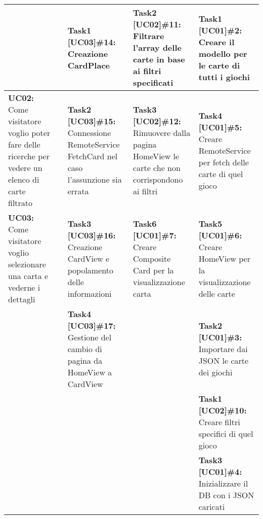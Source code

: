 \documentclass{article}
\begin{document}
\begin{itemize}
\begin{tabular}{ | p{2.4cm} | p{1.4cm} | p{2.7cm} | p{3.4cm} | p{3cm} | }
            & & \textbf{Task1 [UC03]\#14:} Creazione CardPlace
            & \textbf{Task2 [UC02]\#11:} Filtrare l'array delle carte in base ai filtri specificati
            & \textbf{Task1 [UC01]\#2:} Creare il modello per le carte di tutti i giochi \\
            \hline
            \textbf{UC02:} Come visitatore voglio poter fare delle ricerche per vedere un elenco di carte filtrato
            & & \textbf{Task2 [UC03]\#15:} Connessione RemoteService FetchCard nel caso l'assunzione sia errata
            & \textbf{Task3 [UC02]\#12:} Rimuovere dalla pagina HomeView le carte che non corrispondono ai filtri
            & \textbf{Task4 [UC01]\#5:} Creare RemoteService per fetch delle carte di quel gioco \\
            \hline
            \textbf{UC03:} Come visitatore voglio selezionare una carta e vederne i dettagli
            & & \textbf{Task3 [UC03]\#16:} Creazione CardView e popolamento delle informazioni
            & \textbf{Task6 [UC01]\#7:} Creare Composite Card per la visualizzazione carta
            & \textbf{Task5 [UC01]\#6:} Creare HomeView per la visualizzazione delle carte \\
            \hline
            & & \textbf{Task4 [UC03]\#17:} Gestione del cambio di pagina da HomeView a CardView
            & & \textbf{Task2 [UC01]\#3:} Importare dai JSON le carte dei giochi \\
            \hline
            & & & & \textbf{Task1 [UC02]\#10:} Creare filtri specifici di quel gioco  \\
            \hline
            & & & & \textbf{Task3 [UC01]\#4:} Inizializzare il DB con i JSON caricati \\
            \hline
        \end{tabular}
    \end{itemize}
\end{document}
